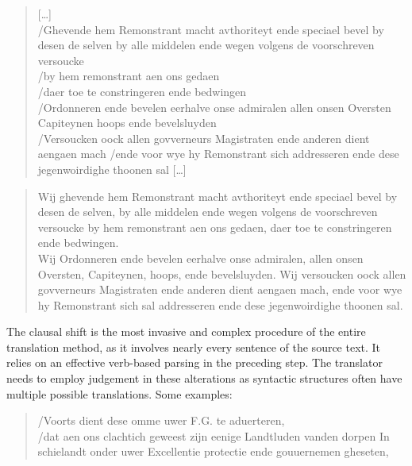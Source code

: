 \begin{paper}
\begin{quote}
{[}\ldots{}{]}\\
/Ghevende hem Remonstrant macht avthoriteyt ende speciael bevel by desen
de selven by alle middelen ende wegen volgens de voorschreven
versoucke\\
/by hem remonstrant aen ons gedaen\\
/daer toe te constringeren ende bedwingen\\
/Ordonneren ende bevelen eerhalve onse admiralen allen onsen Oversten
Capiteynen hoops ende bevelsluyden\\
/Versoucken oock allen govverneurs Magistraten ende anderen dient
aengaen mach /ende voor wye hy Remonstrant sich addresseren ende dese
jegenwoirdighe thoonen sal {[}\ldots{}{]}
\begin{flushright}
\end{flushright}
\end{quote}

\begin{quote}
{Wij} ghevende hem Remonstrant macht avthoriteyt ende speciael bevel by
desen de selven, by alle middelen ende wegen volgens de voorschreven
versoucke by hem remonstrant aen ons gedaen, daer toe te constringeren
ende bedwingen.\\
{Wij} Ordonneren ende bevelen eerhalve onse admiralen, allen onsen
Oversten, Capiteynen, hoops, ende bevelsluyden. {Wij} versoucken oock
allen govverneurs Magistraten ende anderen dient aengaen mach, ende voor
wye hy Remonstrant sich {sal} addresseren ende dese jegenwoirdighe
thoonen sal.
\end{quote}

\noindent The clausal shift is the most invasive and complex procedure of the
entire translation method, as it involves nearly every sentence of the
source text. It relies on an effective verb-based parsing in the
preceding step. The translator needs to employ judgement in these
alterations as syntactic structures often have multiple possible
translations. Some examples:

\begin{quote}
/Voorts dient dese omme uwer F.G. te aduerteren,\\
/dat aen ons clachtich geweest zijn eenige Landtluden vanden dorpen In
schielandt onder uwer Excellentie protectie ende gouuernemen
gheseten,
\begin{flushright}
\end{flushright}
\end{quote}


\end{paper}
